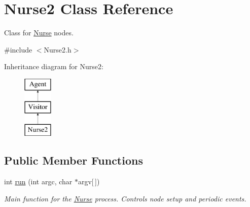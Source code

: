 \hypertarget{classNurse2}{\section{Nurse2 Class Reference}
\label{classNurse2}
}


Class for \hyperlink{classNurse}{Nurse} nodes.  




{\ttfamily \#include $<$Nurse2.\-h$>$}

Inheritance diagram for Nurse2\-:\begin{figure}[H]
\begin{center}
\leavevmode
\includegraphics[height=3.000000cm]{classNurse2}
\end{center}
\end{figure}
\subsection*{Public Member Functions}
\begin{DoxyCompactItemize}
\item 
\hypertarget{classNurse2_a5f7eae9d158eb137b5fcb465c84d1c82}{int \hyperlink{classNurse2_a5f7eae9d158eb137b5fcb465c84d1c82}{run} (int argc, char $\ast$argv\mbox{[}$\,$\mbox{]})}\label{classNurse2_a5f7eae9d158eb137b5fcb465c84d1c82}

\begin{DoxyCompactList}\small\item\em Main function for the \hyperlink{classNurse}{Nurse} process. Controls node setup and periodic events. \end{DoxyCompactList}\end{DoxyCompactItemize}
